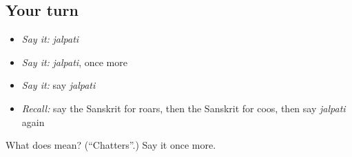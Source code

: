 \subsection*{Your turn}
\begin{itemize}
\raggedright
  \item \emph{Say it:} \emph{jalpati}
  \item \emph{Say it:} \emph{jalpati}, once more
  \item \emph{Say it:} say \emph{jalpati}
  \item \emph{Recall:} say the Sanskrit for roars, then the Sanskrit for coos, then say \emph{jalpati} again
\end{itemize}

\begin{tcolorbox}[breakable,colback=teal!4,colframe=teal!35!black,title={Before you move on}]
What does  mean? (\textquotedblleft{}Chatters\textquotedblright{}.) Say it once more.
\end{tcolorbox}

